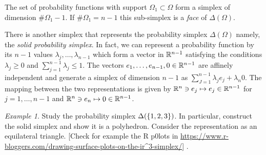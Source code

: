 \documentclass[12pt,a4paper]{amsart}
\theoremstyle{plain}%
\theoremstyle{definition}
\theoremstyle{remark}
\newtheorem{example}{Example}
\begin{document}
The set of probability functions with support $\Omega_1 \subset \Omega$ form a simplex of dimension $\# \Omega_1 -1$. If $\#\Omega_1 = n-1$ this sub-simplex is a \emph{face} of $\Delta(\Omega)$.

There is another simplex that represents the probability simplex $\Delta(\Omega)$ namely, the \emph{solid probability simplex}. In fact, we can represent a probability function by its $n-1$ values $\lambda_j,\dots,\lambda_{n-1}$ which form a vector in $\mathbb{R}^{n-1}$ satisfying the conditions $\lambda_j \geq 0$ and $\sum_{j=1}^{n-1} \lambda_j \leq 1$. The vectors $e_1,\dots,e_{n-1},0 \in \mathbb{R}^{n-1}$ are affinely independent and generate a simplex of dimension $n-1$ as $\sum_{J=1}^{n-1} \lambda_j e_j + \lambda_n 0$. The mapping between the two representations is given by $\mathbb{R}^n \ni e_j \mapsto e_j \in \mathbb{R}^{n-1}$ for $j=1,\dots,n-1$ and $\mathbb{R}^n \ni e_n \mapsto 0 \in \mathbb{R}^{n-1}$.

\begin{example}
  Study the probability simplex $\Delta(\left\{1,2,3\right\})$. In particular, construct the solid simplex and show it is a polyhedron. Consider the representation as an equilateral triangle. [Check for example the R p0lots in \url{https://www.r-bloggers.com/drawing-surface-plots-on-the-ir^3-simplex/}]
.\end{example}
\end{document}
